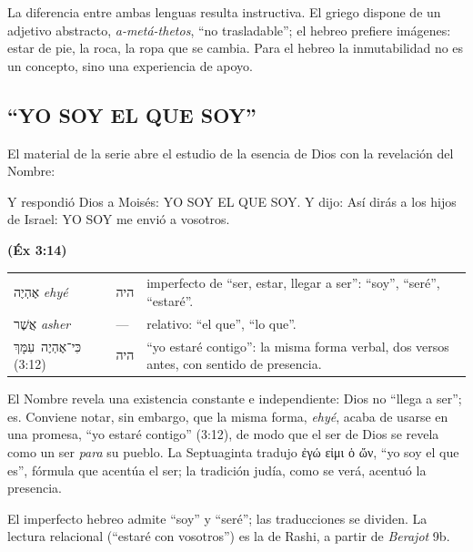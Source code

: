 \documentclass[11pt,letterpaper]{article}
\newcommand{\heb}[1]{\mbox{\foreignlanguage{hebrew}{#1}}}
\newcommand{\grc}[1]{\foreignlanguage{ancientgreek}{#1}}
\newcommand{\hebverso}[1]{\par\smallskip{\centering\begin{otherlanguage}{hebrew}\large #1\end{otherlanguage}\par}\smallskip}
\newcommand{\fuente}[1]{\par\hfill{\upshape\bfseries\small\textcolor{azul}{#1}}}
\begin{document}
La diferencia entre ambas lenguas resulta instructiva. El griego dispone de un adjetivo abstracto, \emph{a-metá-thetos}, ``no trasladable''; el hebreo prefiere imágenes: estar de pie, la roca, la ropa que se cambia. Para el hebreo la inmutabilidad no es un concepto, sino una experiencia de apoyo.

\subsection{``YO SOY EL QUE SOY''}
El material de la serie abre el estudio de la esencia de Dios con la revelación del Nombre:

\hebverso{אֶהְיֶה אֲשֶׁר אֶהְיֶה}
\begin{cita}Y respondió Dios a Moisés: YO SOY EL QUE SOY. Y dijo: Así dirás a los hijos de Israel: YO SOY me envió a vosotros.\fuente{(Éx 3:14)}\end{cita}

\begin{filologia}[Éx 3:14]
\begin{tabular}{@{}L{3.2cm}L{1.6cm}L{10cm}@{}}
\heb{אֶהְיֶה} \emph{ehyé} & \heb{היה} & imperfecto de ``ser, estar, llegar a ser'': ``soy'', ``seré'', ``estaré''. \\[2pt]
\heb{אֲשֶׁר} \emph{asher} & --- & relativo: ``el que'', ``lo que''. \\[2pt]
\heb{כִּי־אֶהְיֶה עִמָּךְ} (3:12) & \heb{היה} & ``yo estaré contigo'': la misma forma verbal, dos versos antes, con sentido de presencia. \\
\end{tabular}
\end{filologia}

El Nombre revela una existencia constante e independiente: Dios no ``llega a ser''; es. Conviene notar, sin embargo, que la misma forma, \emph{ehyé}, acaba de usarse en una promesa, ``yo estaré contigo'' (3:12), de modo que el ser de Dios se revela como un ser \emph{para} su pueblo. La Septuaginta tradujo \grc{ἐγώ εἰμι ὁ ὤν}, ``yo soy el que es'', fórmula que acentúa el ser; la tradición judía, como se verá, acentuó la presencia.

\begin{nota}[Precisión]
El imperfecto hebreo admite ``soy'' y ``seré''; las traducciones se dividen. La lectura relacional (``estaré con vosotros'') es la de Rashi, a partir de \emph{Berajot} 9b.
\end{nota}

\end{document}
